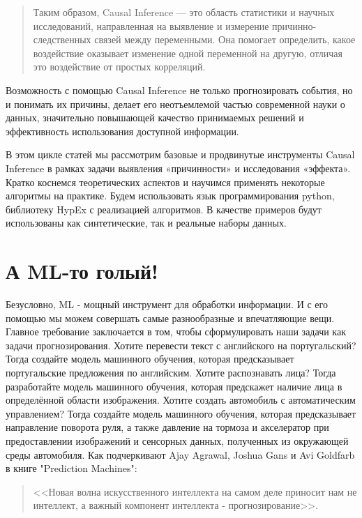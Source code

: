         \begin{quote}
           Таким образом, Causal Inference — это область статистики и научных исследований, направленная на выявление и измерение причинно-следственных связей между переменными.
           Она помогает определить, какое воздействие оказывает изменение одной переменной на другую, отличая это воздействие от простых корреляций.
        \end{quote}

        Возможность с помощью Causal Inference не только прогнозировать события, но и понимать их причины, делает его неотъемлемой частью современной науки о данных, значительно повышающей качество принимаемых решений и эффективность использования доступной информации.

        В этом цикле статей мы рассмотрим базовые и продвинутые инструменты Causal Inference в рамках задачи выявления «причинности» и исследования «эффекта».
        Кратко коснемся теоретических аспектов и научимся применять некоторые алгоритмы на практике.
        Будем использовать язык программирования python, библиотеку HypEx с реализацией алгоритмов.
        В качестве примеров будут использованы как синтетические, так и реальные наборы данных.

    \section*{А ML-то голый!}
        Безусловно, ML - мощный инструмент для обработки информации.
        И с его помощью мы можем совершать самые разнообразные и впечатляющие вещи.
        Главное требование заключается в том, чтобы сформулировать наши задачи как задачи прогнозирования.
        Хотите перевести текст с английского на португальский?
        Тогда создайте модель машинного обучения, которая предсказывает португальские предложения по английским.
        Хотите распознавать лица?
        Тогда разработайте модель машинного обучения, которая предскажет наличие лица в определённой области изображения.
        Хотите создать автомобиль с автоматическим управлением?
        Тогда создайте модель машинного обучения, которая предсказывает направление поворота руля, а также давление на тормоза и акселератор при предоставлении изображений и сенсорных данных, полученных из окружающей среды автомобиля.
        Как подчеркивают Ajay Agrawal, Joshua Gans и Avi Goldfarb в книге "Prediction Machines":
        \begin{quote}
            <<Новая волна искусственного интеллекта на самом деле приносит нам не интеллект, а важный компонент интеллекта - прогнозирование>>.
        \end{quote}

